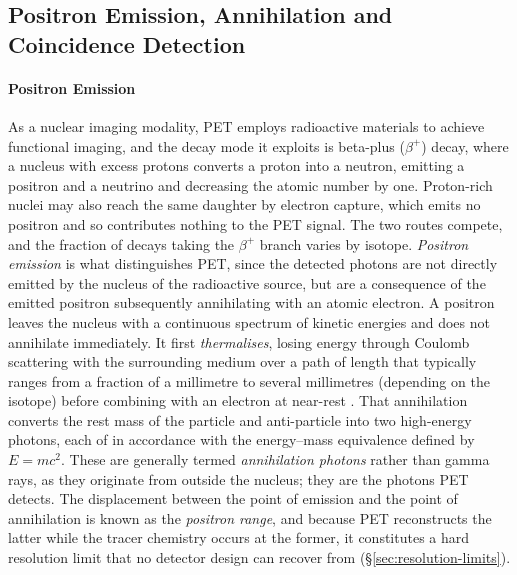 \subsection{Positron Emission, Annihilation and Coincidence Detection}
\label{sec:annihilation}

\paragraph{Positron Emission}
As a nuclear imaging modality, PET employs radioactive materials to achieve functional imaging, and the decay mode it exploits is beta-plus ($\beta^+$) decay, where a nucleus with excess protons converts a proton into a neutron, emitting a positron and a neutrino and decreasing the atomic number by one.
Proton-rich nuclei may also reach the same daughter by electron capture, which emits no positron and so contributes nothing to the PET signal.
The two routes compete, and the fraction of decays taking the $\beta^+$ branch varies by isotope.
\emph{Positron emission} is what distinguishes PET, since the detected photons are not directly emitted by the nucleus of the radioactive source, but are a consequence of the emitted positron subsequently annihilating with an atomic electron.
A positron leaves the nucleus with a continuous spectrum of kinetic energies and does not annihilate immediately.
It first \emph{thermalises}, losing energy through Coulomb scattering with the surrounding medium over a path of length that typically ranges from a fraction of a millimetre to several millimetres (depending on the isotope) before combining with an electron at near-rest \cite{Levin1999}.
That annihilation converts the rest mass of the particle and anti-particle into two high-energy photons, each of  in accordance with the energy--mass equivalence defined by $E=mc^2$.
These are generally termed \emph{annihilation photons} rather than gamma rays, as they originate from outside the nucleus; they are the photons PET detects.
The displacement between the point of emission and the point of annihilation is known as the \emph{positron range}, and because PET reconstructs the latter while the tracer chemistry occurs at the former, it constitutes a hard resolution limit that no detector design can recover from (\S\ref{sec:resolution-limits}).

